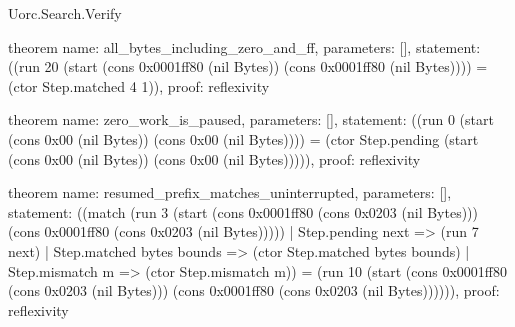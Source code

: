 \begin{lexlean}{Uorc.Search.Verify}
\begin{semanticmodule}
theorem{
  name: all_bytes_including_zero_and_ff,
  parameters: [],
  statement: ((run 20 (start (cons 0x0001ff80 (nil Bytes)) (cons 0x0001ff80 (nil Bytes)))) = (ctor Step.matched 4 1)),
  proof: reflexivity{}
}

theorem{
  name: zero_work_is_paused,
  parameters: [],
  statement: ((run 0 (start (cons 0x00 (nil Bytes)) (cons 0x00 (nil Bytes)))) = (ctor Step.pending (start (cons 0x00 (nil Bytes)) (cons 0x00 (nil Bytes))))),
  proof: reflexivity{}
}

theorem{
  name: resumed_prefix_matches_uninterrupted,
  parameters: [],
  statement: ((match (run 3 (start (cons 0x0001ff80 (cons 0x0203 (nil Bytes))) (cons 0x0001ff80 (cons 0x0203 (nil Bytes)))))
    | Step.pending next => (run 7 next)
    | Step.matched bytes bounds => (ctor Step.matched bytes bounds)
    | Step.mismatch m => (ctor Step.mismatch m)) = (run 10 (start (cons 0x0001ff80 (cons 0x0203 (nil Bytes))) (cons 0x0001ff80 (cons 0x0203 (nil Bytes)))))),
  proof: reflexivity{}
}
\end{semanticmodule}
\end{lexlean}
